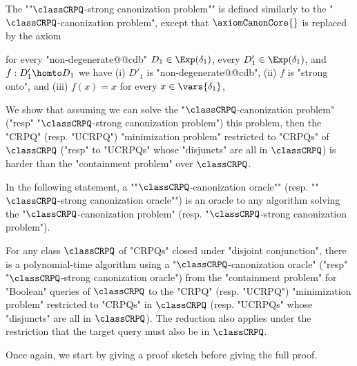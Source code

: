 The \AP""$\classCRPQ$-strong canonization problem"" is defined similarly to the "$\classCRPQ$-canonization problem", except that $\axiomCanonCore{}$ is replaced by the axiom
\begin{description}
	\itemAP[\intro*\axiomStrongCanonCore{}:] 
	for every "non-degenerate@@cdb" 
		$D_1 \in \Exp(\delta_1)$, every $D'_1 \in \Exp(\delta_1)$, and $f: D'_1 \homto D_1$ we have (i) $D'_1$ is "non-degenerate@@cdb", (ii) $f$ is "strong onto", and (iii)  $f(x)=x$ for every $x\in \vars{\delta_1}$,
\end{description}

We show that assuming we can solve the "$\classCRPQ$-canonization problem" ("resp" "$\classCRPQ$-strong canonization problem") this problem, then the "CRPQ"
(resp. "UCRPQ") "minimization problem"
restricted to "CRPQs" of $\classCRPQ$ ("resp" to "UCRPQs" whose "disjuncts" are all in $\classCRPQ$) is harder than the "containment problem" over $\classCRPQ$.

In the following statement, a \AP""$\classCRPQ$-canonization oracle"" (resp. \AP""$\classCRPQ$-strong canonization oracle"") is an oracle to any algorithm solving the "$\classCRPQ$-canonization problem" (resp. "$\classCRPQ$-strong canonization problem").

\begin{lemma}
	\AP\label{lem:reduction-containment-to-minimization}
	For any class $\classCRPQ$ of "CRPQs" closed under "disjoint conjunction",
	there is a polynomial-time algorithm
	using a "$\classCRPQ$-canonization oracle" ("resp" "$\classCRPQ$-strong canonization oracle")
	from the "containment problem" for "Boolean" queries of $\classCRPQ$ to the
	"CRPQ" (resp. "UCRPQ") "minimization problem" restricted to "CRPQs" in $\classCRPQ$
	(resp. "UCRPQs" whose "disjuncts" are all in $\classCRPQ$).
	The reduction also applies under the restriction that the target query must also be in
	$\classCRPQ$.
\end{lemma}

Once again, we start by giving a proof sketch before giving the full proof.

